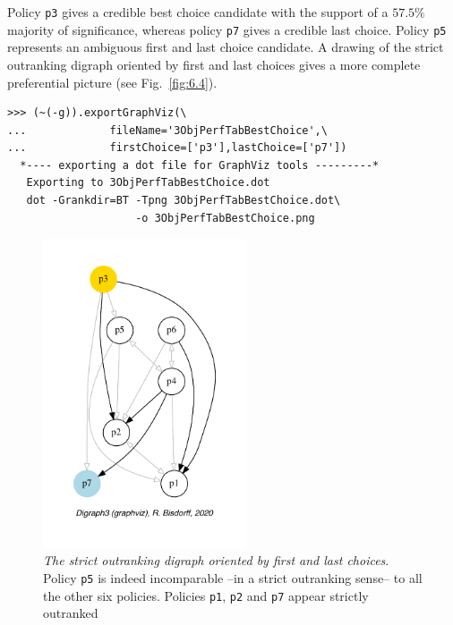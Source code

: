Policy \texttt{p3} gives a credible best choice candidate with the support of a $57.5\%$ majority of significance, whereas policy \texttt{p7} gives a credible last choice. Policy \texttt{p5} represents an ambiguous first and last choice candidate. A drawing of the strict outranking digraph oriented by first and last choices gives a more complete preferential picture (see Fig.~\vref{fig:6.4}).
\begin{lstlisting}
>>> (~(-g)).exportGraphViz(\
...             fileName='3ObjPerfTabBestChoice',\
...             firstChoice=['p3'],lastChoice=['p7'])
  *---- exporting a dot file for GraphViz tools ---------*
   Exporting to 3ObjPerfTabBestChoice.dot
   dot -Grankdir=BT -Tpng 3ObjPerfTabBestChoice.dot\
                    -o 3ObjPerfTabBestChoice.png
\end{lstlisting}
\begin{figure}[ht]
\sidecaption[t]
\includegraphics[width=6cm]{Figures/6-4-3ObjPerfTabBestChoice.pdf}
\caption[The strict outranking digraph oriented by first and last choices]{\emph{The strict outranking digraph oriented by first and last choices}. Policy \texttt{p5} is indeed incomparable --in a strict outranking sense-- to all the other six policies. Policies \texttt{p1}, \texttt{p2} and \texttt{p7} appear strictly outranked}
\label{fig:6.4}       %
\end{figure}

